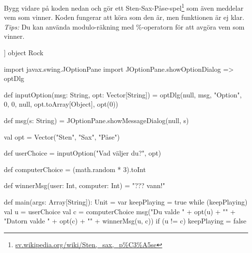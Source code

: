 \Task Bygg vidare på koden nedan och gör ett Sten-Sax-Påse-spel\footnote{\href{https://sv.wikipedia.org/wiki/Sten,\_sax,\_p\%C3\%A5se}{sv.wikipedia.org/wiki/Sten,\_sax,\_p\%C3\%A5se}} som även meddelar vem som vinner. Koden fungerar att köra som den är, men funktionen  är ej klar. \emph{Tips:} Du kan använda modulo-räkning med \%-operatorn för att avgöra vem som vinner.

\begin{Code}[basicstyle=\ttfamily\footnotesize\selectfont]]
object Rock {
  import javax.swing.JOptionPane
  import JOptionPane.{showOptionDialog => optDlg}
  
  def inputOption(msg: String, opt: Vector[String]) = 
    optDlg(null, msg, "Option", 0, 0, null, opt.toArray[Object], opt(0))
    
  def msg(s: String) = JOptionPane.showMessageDialog(null, s)  
  
  val opt =  Vector("Sten", "Sax", "Påse")
   
  def userChoice = inputOption("Vad väljer du?", opt)
  
  def computerChoice = (math.random * 3).toInt     
  
  def winnerMsg(user: Int, computer: Int) = "??? vann!"
  
  def main(args: Array[String]): Unit = {
    var keepPlaying = true
    while (keepPlaying) {
      val u = userChoice
      val c = computerChoice
      msg("Du valde " + opt(u) + "\n" + 
          "Datorn valde " + opt(c) + "\n" + 
          winnerMsg(u, c))
      if (u != c) keepPlaying = false 
    }
  }
}
\end{Code}
